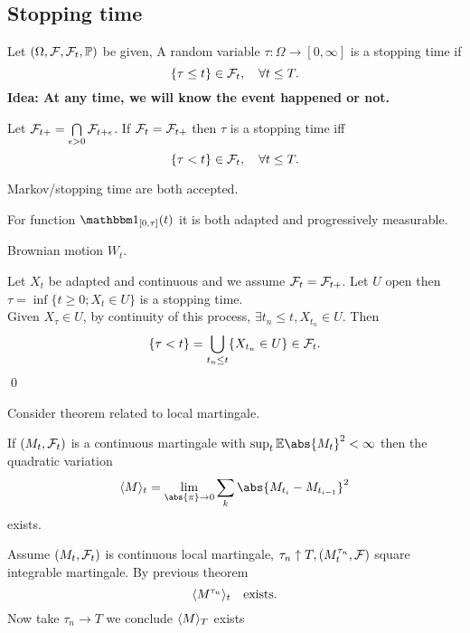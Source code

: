 \newpage
\subsection{Stopping time}\label{Stopping}
Let $(\Omega, \mathcal{F}, \mathcal{F}_t, \mathbb{P})$ be given, A random variable $\tau: \Omega \rightarrow [0,\infty]$ is a stopping time if 
\begin{equation*}
    \{\tau \leq t\} \in \mathcal{F}_t, \quad \forall t\leq T.
\end{equation*}
\textbf{Idea: At any time, we will know the event happened or not.}
\begin{thm}
Let $\mathcal{F}_{t+} = \bigcap\limits_{\epsilon>0} \mathcal{F}_{t+\epsilon}$. If $\mathcal{F}_t = \mathcal{F}_{t+}$ then $\tau$  is a stopping time iff 
\begin{equation*}
    \{\tau < t\} \in \mathcal{F}_t, \quad \forall t\leq T.
\end{equation*}
\end{thm}
Markov/stopping time are both accepted.

\begin{rem} For function $\I{[0, \tau]}(t)$ it is both adapted and progressively measurable.
\end{rem}
\begin{example}
Brownian motion $W_t$.
\end{example}

\begin{example}
Let $X_t$ be adapted and continuous and we assume $\mathcal{F}_t = \mathcal{F}_{t+}$. Let $U$ open then $\tau = \inf \{t\geq 0; X_t \in U\}$ is a stopping time. \\
\pf Given $X_\tau \in U$, by continuity of this process,  $\exists t_n \leq t, X_{t_n} \in U$. Then \begin{equation*}
    \{\tau < t\} = \bigcup\limits_{t_n \leq t} \{X_{t_n}\in U\}\in \mathcal{F}_t.
\end{equation*}
\qed
\end{example}

Consider theorem related to local martingale.

If $(M_t, \mathcal{F}_t)$ is a continuous martingale with $\sup_t \E\abs{M_t}^2 < \infty$ then the quadratic variation
\begin{equation*}
    \qvar{M}{t} = \biglim{\abs{\pi}\rightarrow 0}\bigs{k} \abs{M_{t_i} - M_{t_{i-1}}}^2
\end{equation*}
exists.
\begin{cor}
Assume $(M_t, \mathcal{F}_t)$ is continuous local martingale, $\tau_n \uparrow T, (M_t^{\tau_n}, \mathcal{F})$ square integrable martingale. By previous theorem
\begin{equation*}
    \langle{M^{\tau_n}} \rangle_{t} \quad \text{exists}.
\end{equation*}
Now take $\tau_n \rightarrow T$ we conclude $\langle{M} \rangle_{T}$ exists
\end{cor}

